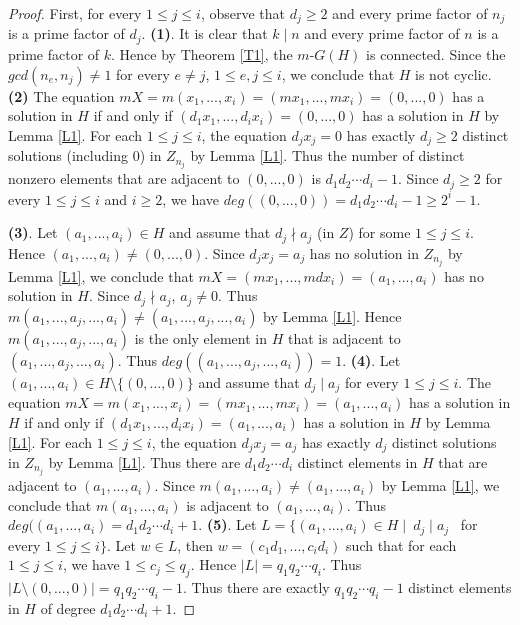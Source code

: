\documentclass{amsart}
\theoremstyle{plain}
\begin{document}
\begin{proof}
	 First, for every $1 \leq j \leq i$, observe that $d_j \geq 2$ and every prime factor of $n_j$ is a prime factor of $d_j$.
	 \vskip0.1in
	{\bf (1)}. It is clear that $k \mid n$ and every prime factor of $n$ is a prime factor of $k$. Hence by Theorem \ref{T1}, the $m$-$G(H)$ is connected. Since the $gcd(n_e, n_j) \not = 1$ for every $e \not = j$, $1 \leq e, j \leq i$, we conclude that $H$ is not cyclic.
	\vskip0.1in
	{\bf (2)} The equation $mX = m(x_1,..., x_i) = (mx_1, ... , mx_i) = (0, ..., 0)$ has a solution in $H$ if and only if $(d_1x_1, ... , d_ix_i) = (0, ... , 0)$ has a solution in $H$ by Lemma \ref{L1}. For each $1 \leq j \leq i$, the equation $d_jx_j = 0$ has exactly $d_j \geq 2$ distinct solutions (including 0) in $Z_{n_j}$ by Lemma \ref{L1}. Thus the number of distinct nonzero elements that are adjacent to $(0, ... , 0)$ is $d_1d_2 \cdots d_i - 1$. Since $d_j \geq 2$ for every $1\leq j \leq i$ and $i \geq 2$, we have $deg((0, ... , 0)) = d_1d_2 \cdots d_i - 1 \geq 2^i - 1$.

{\bf (3)}. Let $(a_1, ..., a_i) \in H$ and assume that $d_j \nmid a_j$ (in $Z$) for some $1 \leq j \leq i$. Hence $(a_1, ... , a_i) \not = (0, ... , 0)$. Since $d_jx_j = a_j$ has no solution in $Z_{n_j}$ by Lemma \ref{L1}, we conclude that $mX = (mx_1, ..., mdx_i) = (a_1, ... , a_i)$ has no solution in $H$. Since $d_j \nmid a_j$, $a_j \not = 0$. Thus $m(a_1, ..., a_j, ..., a_i) \not = (a_1, ..., a_j, ... , a_i)$ by Lemma \ref{L1}. Hence $m(a_1, ..., a_j, ..., a_i)$ is the only element in $H$ that is adjacent to $(a_1, ..., a_j, ..., a_i)$. Thus $deg((a_1, ..., a_j, ..., a_i)) = 1$.
\vskip0.1in
{\bf (4)}. Let $(a_1, ..., a_i) \in H \setminus \{ (0, ..., 0)\}$ and assume that $d_j \mid a_j$ for every $1 \leq j \leq i$. The equation $mX = m(x_1,..., x_i) = (mx_1, ... , mx_i) = (a_1, ..., a_i)$ has a solution in $H$ if and only if $(d_1x_1, ... , d_ix_i) = (a_1, ... , a_i)$ has a solution in $H$ by Lemma \ref{L1}. For each $1 \leq j \leq i$, the equation $d_jx_j = a_j$ has exactly $d_j$ distinct solutions  in $Z_{n_j}$ by Lemma \ref{L1}. Thus there are $d_1d_2 \cdots d_i$ distinct elements in $H$ that are adjacent to $(a_1, ... , a_i)$. Since $m(a_1, ..., a_i) \not = (a_1, ..., a_i)$ by Lemma \ref{L1}, we conclude that $m(a_1, ..., a_i)$ is adjacent to $(a_1, ..., a_i)$. Thus $deg((a_1, ... , a_i) = d_1d_2 \cdots d_i + 1$.
\vskip 0.1in
{\bf (5)}. Let $L = \{(a_1, ..., a_i) \in H \mid \   d_j \mid a_j$ \ for every $1 \leq j \leq i\}$. Let $w \in L$, then $w = (c_1d_1, ..., c_id_i)$ such that for each $1 \leq j \leq i$, we have $1 \leq c_j \leq q_j$. Hence $|L| = q_1q_2 \cdots q_i$. Thus $|L \setminus (0, ... , 0)| = q_1q_2 \cdots q_i - 1$. Thus there are exactly $q_1q_2 \cdots q_i - 1$ distinct elements in $H$ of degree $d_1d_2 \cdots d_i + 1$.


\end{proof}
\end{document}
